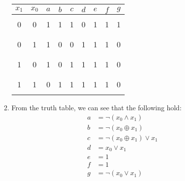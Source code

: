 \documentclass{article}
\newcommand*\xor{\oplus}
\begin{document}
\begin{enumerate}
\begin{enumerate}
		            \begin{tabular}{|c|c||c|c|c|c|c|c|c|}
			            \hline
			            $x_1$ & $x_0$ & $a$ & $b$ & $c$ & $d$ & $e$ & $f$ & $g$ \\
			            \hline
			                  &       &     &     &     &     &     &     &     \\
			            0     & 0     & 1   & 1   & 1   & 0   & 1   & 1   & 1   \\
			                  &       &     &     &     &     &     &     &     \\
			            \hline
			                  &       &     &     &     &     &     &     &     \\
			            0     & 1     & 1   & 0   & 0   & 1   & 1   & 1   & 0   \\
			                  &       &     &     &     &     &     &     &     \\
			            \hline
			                  &       &     &     &     &     &     &     &     \\
			            1     & 0     & 1   & 0   & 1   & 1   & 1   & 1   & 0   \\
			                  &       &     &     &     &     &     &     &     \\
			            \hline
			                  &       &     &     &     &     &     &     &     \\
			            1     & 1     & 0   & 1   & 1   & 1   & 1   & 1   & 0   \\
			                  &       &     &     &     &     &     &     &     \\
			            \hline
		            \end{tabular}

		      \item From the truth table, we can see that the following hold:
		            \begin{align*}
			            a & = \lnot (x_0 \land x_1)         \\
			            b & = \lnot (x_0 \xor x_1)          \\
			            c & = \lnot (x_0 \xor x_1) \lor x_1 \\
			            d & = x_0 \lor x_1                  \\
			            e & = 1                             \\
			            f & = 1                             \\
			            g & = \lnot (x_0 \lor x_1)
		            \end{align*}



\end{enumerate}
\end{enumerate}
\end{document}
